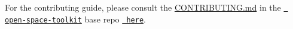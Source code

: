 For the contributing guide, please consult the \mbox{\hyperlink{_c_o_n_t_r_i_b_u_t_i_n_g_8md}{C\+O\+N\+T\+R\+I\+B\+U\+T\+I\+N\+G.\+md}} in the \href{https://github.com/open-space-collective/open-space-toolkit}{\texttt{ open-\/space-\/toolkit}} base repo \href{https://github.com/open-space-collective/open-space-toolkit/blob/main/CONTRIBUTING.md}{\texttt{ here}}. 